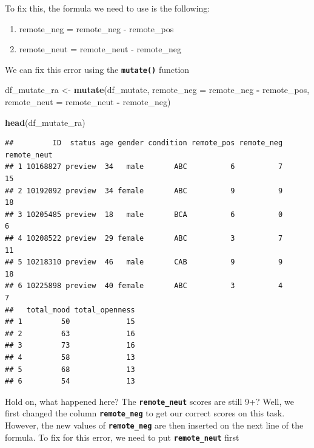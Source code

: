 \documentclass[
]{book}
\newenvironment{Shaded}{\begin{snugshade}}{\end{snugshade}}
\newcommand{\AttributeTok}[1]{\textcolor[rgb]{0.13,0.29,0.53}{#1}}
\newcommand{\FunctionTok}[1]{\textcolor[rgb]{0.13,0.29,0.53}{\textbf{#1}}}
\newcommand{\NormalTok}[1]{#1}
\newcommand{\OtherTok}[1]{\textcolor[rgb]{0.56,0.35,0.01}{#1}}
\newcommand{\SpecialCharTok}[1]{\textcolor[rgb]{0.81,0.36,0.00}{\textbf{#1}}}
\begin{document}
To fix this, the formula we need to use is the following:

\begin{enumerate}
\def\labelenumi{\arabic{enumi}.}
\item
  remote\_neg = remote\_neg - remote\_pos
\item
  remote\_neut = remote\_neut - remote\_neg
\end{enumerate}

We can fix this error using the \textbf{\texttt{mutate()}} function

\begin{Shaded}
\begin{Highlighting}[]
\NormalTok{df\_mutate\_ra }\OtherTok{\textless{}{-}} \FunctionTok{mutate}\NormalTok{(df\_mutate, }
                    \AttributeTok{remote\_neg =}\NormalTok{ remote\_neg }\SpecialCharTok{{-}}\NormalTok{ remote\_pos,}
                    \AttributeTok{remote\_neut =}\NormalTok{ remote\_neut }\SpecialCharTok{{-}}\NormalTok{ remote\_neg)}

\FunctionTok{head}\NormalTok{(df\_mutate\_ra)}
\end{Highlighting}
\end{Shaded}

\begin{verbatim}
##         ID  status age gender condition remote_pos remote_neg remote_neut
## 1 10168827 preview  34   male       ABC          6          7          15
## 2 10192092 preview  34 female       ABC          9          9          18
## 3 10205485 preview  18   male       BCA          6          0           6
## 4 10208522 preview  29 female       ABC          3          7          11
## 5 10218310 preview  46   male       CAB          9          9          18
## 6 10225898 preview  40 female       ABC          3          4           7
##   total_mood total_openness
## 1         50             15
## 2         63             16
## 3         73             16
## 4         58             13
## 5         68             13
## 6         54             13
\end{verbatim}

Hold on, what happened here? The \textbf{\texttt{remote\_neut}} scores are still 9+? Well, we first changed the column \textbf{\texttt{remote\_neg}} to get our correct scores on this task. However, the new values of \textbf{\texttt{remote\_neg}} are then inserted on the next line of the formula. To fix for this error, we need to put \textbf{\texttt{remote\_neut}} first

\begin{Shaded}
\end{Shaded}
\end{document}
